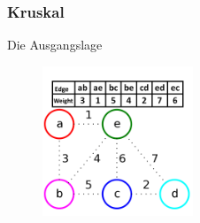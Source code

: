 \documentclass[a4paper,10pt]{report}
\begin{document}
\subsubsection{Kruskal}
Die Ausgangslage
\begin{figure}[H]
	\begin{center}
  		\includegraphics[width=0.4\textwidth]{img/kruskal1.png}
	\end{center}
\end{figure}
\end{document}
